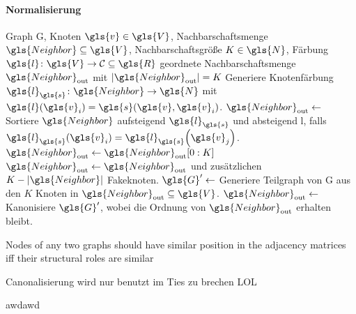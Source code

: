 \paragraph{Normalisierung}
\label{normalisierung}

\begin{algorithm}[t]
\centering
\begin{algorithmic}
  \REQUIRE{} Graph \gls{G}, Knoten $\gls{v} \in \gls{V}$, Nachbarschaftsmenge $\gls{Neighbor} \subseteq \gls{V}$, Nachbarschaftsgröße $K \in \gls{N}$, Färbung $\gls{l} \colon \gls{V} \to \mathcal{C} \subseteq \gls{R}$
  \ENSURE{} geordnete Nachbarschaftsmenge $\gls{Neighbor}_{\mathrm{out}}$ mit $\left|\gls{Neighbor}_{\mathrm{out}}\right| = K$
  \STATE{} Generiere Knotenfärbung $\gls{l}_{\gls{s}} \colon \gls{Neighbor} \to \gls{N}$ mit $\gls{l}\left(\gls{v}_i\right) = \gls{s}\left(\gls{v}, \gls{v}_i\right)$.
  \STATE{} $\gls{Neighbor}_{\mathrm{out}} \leftarrow$ Sortiere $\gls{Neighbor}$ aufsteigend \bzgl{} $\gls{l}_{\gls{s}}$ und absteigend \bzgl{} \gls{l}, falls $\gls{l}_{\gls{s}}\left(\gls{v}_i\right) = \gls{l}_{\gls{s}}\left(\gls{v}_j\right)$.
    \STATE{} $\gls{Neighbor}_{\mathrm{out}} \leftarrow \gls{Neighbor}_{\mathrm{out}}\left[0:K\right]$
  \ENDIF{}
    \STATE{} $\gls{Neighbor}_{\mathrm{out}} \leftarrow \gls{Neighbor}_{\mathrm{out}}$ und zusätzlichen $K - \left|\gls{Neighbor}\right|$ Fakeknoten.
  \ENDIF{}
  \STATE{} $\gls{G}^{\prime} \leftarrow$ Generiere Teilgraph von \gls{G} aus den $K$ Knoten in $\gls{Neighbor}_{\mathrm{out}} \subseteq \gls{V}$.
  \STATE{} $\gls{Neighbor}_{\mathrm{out}} \leftarrow$ Kanonisiere $\gls{G}^{\prime}$, wobei die Ordnung von $\gls{Neighbor}_{\mathrm{out}}$ erhalten bleibt.
\end{algorithmic}
\caption[Normalisierungsschritt der räumlichen Faltung]{}
\label{alg:normalisierung}
\end{algorithm}


Nodes of any two graphs should have similar position in the
adjacency matrices iff their structural roles are similar

Canonalisierung wird nur benutzt im Ties zu brechen  LOL

awdawd
